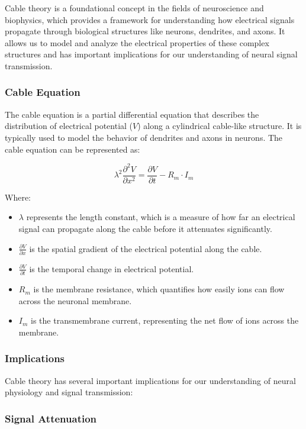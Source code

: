 \documentclass{article}
\begin{document}
Cable theory is a foundational concept in the fields of neuroscience and biophysics, which provides a framework for understanding how electrical signals propagate through biological structures like neurons, dendrites, and axons. It allows us to model and analyze the electrical properties of these complex structures and has important implications for our understanding of neural signal transmission.

\subsubsection{Cable Equation}

The cable equation is a partial differential equation that describes the distribution of electrical potential (\(V\)) along a cylindrical cable-like structure. It is typically used to model the behavior of dendrites and axons in neurons. The cable equation can be represented as:

\[
\lambda^2 \frac{{\partial^2 V}}{{\partial x^2}} = \frac{{\partial V}}{{\partial t}} - R_m \cdot I_m
\]

Where:
\begin{itemize}
  \item \(\lambda\) represents the length constant, which is a measure of how far an electrical signal can propagate along the cable before it attenuates significantly.
  \item \(\frac{{\partial V}}{{\partial x}}\) is the spatial gradient of the electrical potential along the cable.
  \item \(\frac{{\partial V}}{{\partial t}}\) is the temporal change in electrical potential.
  \item \(R_m\) is the membrane resistance, which quantifies how easily ions can flow across the neuronal membrane.
  \item \(I_m\) is the transmembrane current, representing the net flow of ions across the membrane.
\end{itemize}

\subsubsection{Implications}

Cable theory has several important implications for our understanding of neural physiology and signal transmission:

\subsubsection{Signal Attenuation}
\end{document}
